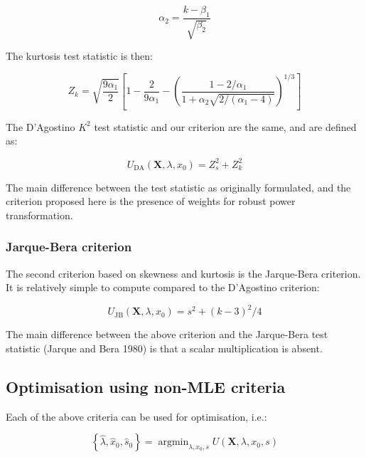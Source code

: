 \documentclass[preprint,12pt,authoryear]{elsarticle}
\DeclareMathOperator*{\argmin}{argmin}
\begin{document}
\begin{equation}
\alpha_2 = \frac{k - \beta_1}{\sqrt{\beta_2}}
\end{equation}

The kurtosis test statistic is then:

\begin{equation}
Z_k = \sqrt{\frac{9 \alpha_1}{2}} \left[ 1 - \frac{2}{9 \alpha_1} - \left(\frac{1 - 2 / \alpha_1}{1 + \alpha_2 \sqrt{2 / \left(\alpha_1 - 4 \right)}} \right)^{1 / 3}  \right]
\end{equation}

The D'Agostino \(K^2\) test statistic and our criterion are the same,
and are defined as:

\begin{equation}
U_{\text{DA}} \left(\mathbf{X}, \lambda, x_0 \right) = Z_s^2 + Z_k^2
\end{equation}

The main difference between the test statistic as originally formulated,
and the criterion proposed here is the presence of weights for robust
power transformation.

\subsubsection{Jarque-Bera criterion}\label{jarque-bera-criterion}

The second criterion based on skewness and kurtosis is the Jarque-Bera
criterion. It is relatively simple to compute compared to the D'Agostino
criterion:

\begin{equation}
U_{\text{JB}} \left(\mathbf{X}, \lambda, x_0 \right) = s^2 + \left(k - 3\right)^2 / 4
\end{equation}

The main difference between the above criterion and the Jarque-Bera test
statistic (Jarque and Bera 1980) is that a scalar multiplication is
absent.

\subsection{Optimisation using non-MLE
criteria}\label{optimisation-using-non-mle-criteria}

Each of the above criteria can be used for optimisation, i.e.:

\begin{equation}
\left\{ \hat{\lambda}, \hat{x}_0, \hat{s}_0 \right\} = \argmin_{\lambda, x_0, s} U\left(\mathbf{X}, \lambda, x_0, s \right)
\end{equation}
\end{document}
